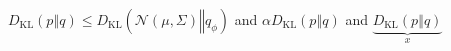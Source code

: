 \newcommand{\KL}[2]{D_{\mathrm{KL}}(#1 \| #2)}
$D_{\mathrm{KL}}(p ‖ q) ≤ D_{\mathrm{KL}}(𝒩(μ,Σ) ‖ q_{ϕ})$ and $α D_{\mathrm{KL}}(p ‖ q)$ and $\underbrace{D_{\mathrm{KL}}(p ‖ q)}_{x}$
